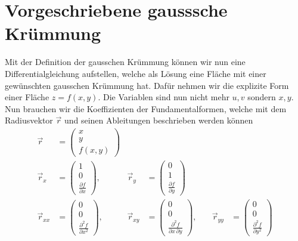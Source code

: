 %
%
%
%
\section{Vorgeschriebene gausssche Krümmung
\label{mongeampere:section:teil2}}
Mit der Definition der gausschen Krümmung können wir nun eine Differentialgleichung aufstellen,
welche als Lösung eine Fläche mit einer gewünschten gausschen Krümmung hat.
Dafür nehmen wir die explizite Form einer Fläche $z = f(x,y)$.
Die Variablen sind nun nicht mehr $u, v$ sondern $x, y$.
Nun brauchen wir die Koeffizienten der Fundamentalformen, welche mit dem Radiusvektor $\vec r$ und seinen Ableitungen 
beschrieben werden können
\begin{align}
  \vec r &= \begin{pmatrix}
   x \\
   y \\
   f(x, y)
 \end{pmatrix} \\
    \vec r_x &= \begin{pmatrix}
      1 \\
      0 \\
      \frac{\partial f}{\partial x}
    \end{pmatrix},
      \quad &
    \vec r_y &= \begin{pmatrix}
      0 \\
      1 \\
      \frac{\partial f}{\partial y}
    \end{pmatrix}\\
      \vec r_{xx} &= \begin{pmatrix}
      0 \\
      0 \\
      \frac{\partial^2 f}{\partial x^2}
    \end{pmatrix},
    \quad &
    \vec r_{xy} &= \begin{pmatrix}
      0 \\
      0 \\
      \frac{\partial^2 f}{\partial x \, \partial y}
    \end{pmatrix},
      \quad &
    \vec r_{yy} &= \begin{pmatrix}
      0 \\
      0 \\
      \frac{\partial^2 f}{\partial y^2}
    \end{pmatrix}\\
\end{align}
